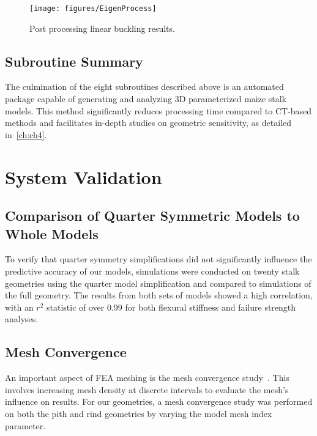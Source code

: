 \begin{figure}[htbp]
	\centering
	\texttt{[image: figures/EigenProcess]}
	\caption[Post processing linear buckling results.]{Post processing linear buckling results.}
	\label{fig:EigenProcess}
\end{figure}

\subsection{Subroutine Summary}
\label{ssec:subroutine_summary}
The culmination of the eight subroutines described above is an automated package capable of generating and analyzing 3D parameterized maize stalk models. This method significantly reduces processing time compared to CT-based methods and facilitates in-depth studies on geometric sensitivity, as detailed in~\cref{ch:ch4}.

\section{System Validation}
\label{sec:system_validation}

\subsection{Comparison of Quarter Symmetric Models to Whole Models}
\label{ssec:comparison_of_quarter_symmetric_models}
To verify that quarter symmetry simplifications did not significantly influence the predictive accuracy of our models, simulations were conducted on twenty stalk geometries using the quarter model simplification and compared to simulations of the full geometry. The results from both sets of models showed a high correlation, with an ${r^{2}}$ statistic of over 0.99 for both flexural stiffness and failure strength analyses.
\newline
\newline

\subsection{Mesh Convergence}
\label{ssec:mesh_convergence}
An important aspect of FEA meshing is the mesh convergence study~. This involves increasing mesh density at discrete intervals to evaluate the mesh's influence on results. For our geometries, a mesh convergence study was performed on both the pith and rind geometries by varying the model mesh index parameter. 

